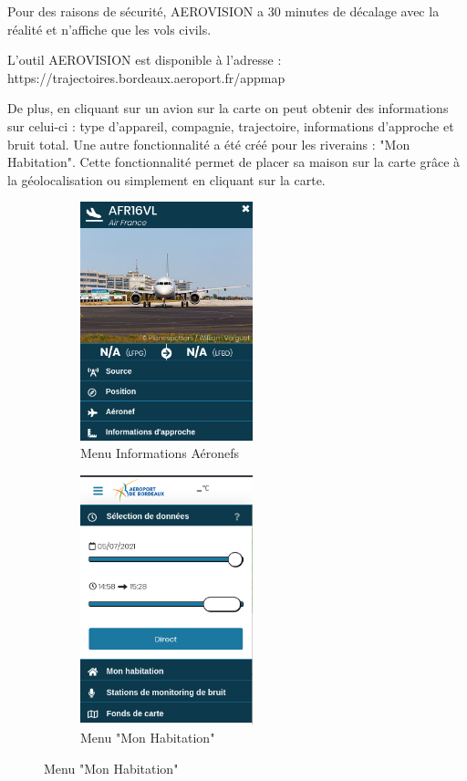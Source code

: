 Pour des raisons de sécurité, AEROVISION a 30 minutes de décalage avec la réalité et n'affiche que les vols civils.

L'outil AEROVISION est disponible à l'adresse : https://trajectoires.bordeaux.aeroport.fr/appmap\newline

De plus, en cliquant sur un avion sur la carte on peut obtenir des informations sur celui-ci : type d'appareil, compagnie, trajectoire, informations d'approche et bruit total.
Une autre fonctionnalité a été créé pour les riverains : "Mon Habitation". Cette fonctionnalité permet de placer sa maison sur la carte grâce à la géolocalisation ou simplement en cliquant sur la carte.

\begin{figure}[hbt!]
  \begin{subfigure}{0.5\textwidth}
    \centering
    \includegraphics[width=5cm]{Images/aerovisioninfo.png}  
    \caption{Menu Informations Aéronefs}
    \label{fig:aerovisioninfo}
  \end{subfigure}
  \begin{subfigure}{0.5\textwidth}
    \centering
    \includegraphics[width=5cm]{Images/aerovisionmaison.png}  
    \caption{Menu "Mon Habitation"}
    \label{fig:aerovisionmaison}
  \end{subfigure}
\end{figure}

